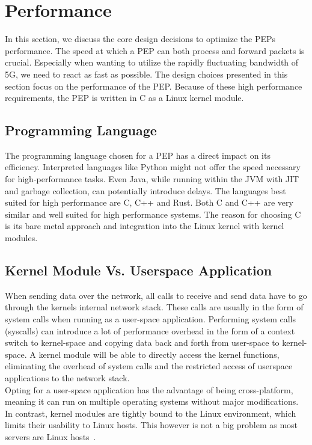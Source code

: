 \documentclass[a4paper,english, 12pt]{report}
\begin{document}
\section{Performance}
In this section, we discuss the core design decisions to optimize the PEPs performance.
The speed at which a PEP can both process and forward packets is crucial. Especially when wanting to utilize the rapidly fluctuating bandwidth of 5G, we need to react as fast as possible. The design choices presented in this section focus on the performance of the PEP. Because of these high performance requirements, the PEP is written in C as a Linux kernel module. 

\subsection{Programming Language}
The programming language chosen for a PEP has a direct impact on its efficiency. Interpreted languages like Python might not offer the speed necessary for high-performance tasks. Even Java, while running within the JVM with JIT and garbage collection, can potentially introduce delays. The languages best suited for high performance are C, C++ and Rust. Both C and C++ are very similar and well suited for high performance systems. The reason for choosing C is its bare metal approach and integration into the Linux kernel with kernel modules.

\subsection{Kernel Module Vs. Userspace Application}
When sending data over the network, all calls to receive and send data have to go through the kernels internal network stack. These calls are usually in the form of system calls when running as a user-space application. Performing system calls (syscalls) can introduce a lot of performance overhead in the form of a context switch to kernel-space and copying data back and forth from user-space to kernel-space. A kernel module will be able to directly access the kernel functions, eliminating the overhead of system calls and the restricted access of userspace applications to the network stack.\\

Opting for a user-space application has the advantage of being cross-platform, meaning it can run on multiple operating systems without major modifications. In contrast, kernel modules are tightly bound to the Linux environment, which limits their usability to Linux hosts. This however is not a big problem as most servers are Linux hosts~\cite{w3techs_operating_system_statistics}.
\end{document}
